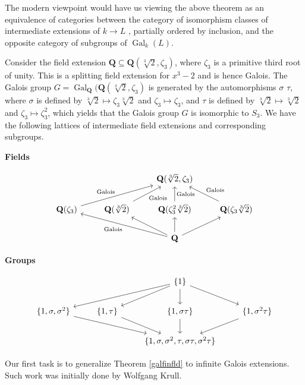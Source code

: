 \documentclass[11pt,openany]{book} %
\newcommand{\Q}{\mathbf{Q}}
\begin{document}
\begin{remark}
The modern viewpoint would have us viewing the above theorem as an equivalence of categories between the category of isomorphism classes of intermediate extensions of $k \to L$ , partially ordered by inclusion, and the opposite category of subgroups of $\operatorname{Gal}_k(L)$.
\end{remark}

\begin{example}
Consider the field extension $\Q \subseteq \Q(\sqrt[3]{2},\zeta_3)$, where $\zeta_3$ is a primitive third root of unity. This is a splitting field extension for $x^3 - 2$ and is hence Galois. The Galois group $G = \operatorname{Gal}_{\Q}(\Q(\sqrt[3]{2},\zeta_3)$ is generated by the automorphisms $\sigma$ $\tau$, where $\sigma$ is defined by $\sqrt[3]{2} \mapsto \zeta_3\sqrt[3]{2}$ and $\zeta_3 \mapsto \zeta_3$, and $\tau$ is defined by $\sqrt[3]{2} \mapsto \sqrt[3]{2}$ and $\zeta_3 \mapsto \zeta_3^2$, which yields that the Galois group $G$ is isomorphic to $S_3$. We have the following lattices of intermediate field extensions and corresponding subgroups.
\pagebreak

\begin{center} \textbf{Fields} \end{center}
\[
\begin{tikzcd}
& & \Q(\sqrt[3]{2}, \zeta_3) & \\
\Q(\zeta_3) \ar[urr, "\text{Galois}"] & \Q(\sqrt[3]{2}) \ar[ur, "\text{Galois}", swap] & \Q(\zeta_3^2\sqrt[3]{2}) \ar[u, "\text{Galois}", swap] & \Q(\zeta_3\sqrt[3]{2}) \ar[ul, "\text{Galois}", swap] \\
& & \Q \ar[ull, "\text{Galois}"] \ar[ul] \ar[u] \ar[ur] &
\end{tikzcd}
\]
\begin{center} \textbf{Groups} \end{center}
\[
\begin{tikzcd}
& & \{1\} \ar[lld] \ar[ld] \ar[d] \ar[rd] & \\
\{1,\sigma,\sigma^2\} \ar[rrd] & \{1,\tau\} \ar[rd] & \{1, \sigma\tau\} \ar[d] & \{1,\sigma^2\tau\} \ar[ld] \\
& & \{1,\sigma,\sigma^2,\tau,\sigma \tau, \sigma^2\tau\} &
\end{tikzcd}
\]
\end{example}

Our first task is to generalize Theorem \ref{galfinfld} to infinite Galois extensions. Such work was initially done by Wolfgang Krull.\\
\end{document}
